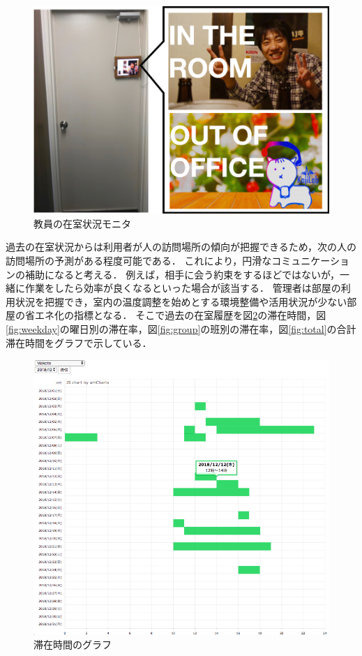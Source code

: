 \begin{figure}[H]
  \begin{center}
    \includegraphics[width=150mm]{image/OccupancyMonitor.png}
    \caption{教員の在室状況モニタ}
    \label{fig:monitor}
  \end{center}
\end{figure}

過去の在室状況からは利用者が人の訪問場所の傾向が把握できるため，次の人の訪問場所の予測がある程度可能である．
これにより，円滑なコミュニケーションの補助になると考える．
例えば，相手に会う約束をするほどではないが，一緒に作業をしたら効率が良くなるといった場合が該当する．
管理者は部屋の利用状況を把握でき，室内の温度調整を始めとする環境整備や活用状況が少ない部屋の省エネ化の指標となる．
そこで過去の在室履歴を図\ref{fig:staytime}の滞在時間，図\ref{fig:weekday}の曜日別の滞在率，図\ref{fig:group}の班別の滞在率，図\ref{fig:total}の合計滞在時間をグラフで示している．


\begin{figure}[H]
  \begin{center}
    \includegraphics[width=160mm]{image/StayTime.png}
    \caption{滞在時間のグラフ}
    \label{fig:staytime}
  \end{center}
\end{figure}

